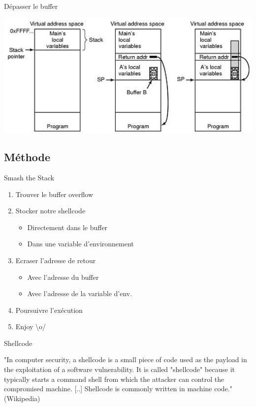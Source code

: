\documentclass{beamer}
\begin{document}
\begin{frame}{Dépasser le buffer}
	\begin{center}
		\includegraphics[width=1\textwidth]{images/buffer_overflow_attack.jpg}
	\end{center}
\end{frame}

\subsection{Méthode}

\begin{frame}{Smash the Stack}
	\begin{enumerate}
		\itemsep1.3em
		\item Trouver le buffer overflow
		\item Stocker notre shellcode
		\begin{itemize}
			\item Directement dans le buffer
			\item Dans une variable d'environnement
		\end{itemize}
		\item Ecraser l'adresse de retour
		\begin{itemize}
			\item Avec l'adresse du buffer
			\item Avec l'adresse de la variable d'env.
		\end{itemize}
		\item Poursuivre l'exécution
		\item Enjoy \Large{\textbackslash o/}
	\end{enumerate}
\end{frame}

\begin{frame}{Shellcode}
	\begin{center}
		"In computer security, a shellcode is a small piece of code used as the payload in the exploitation of a software vulnerability. It is called "shellcode" because it typically starts a command shell from which the attacker can control the compromised machine. [..] Shellcode is commonly written in machine code." (Wikipedia)
	\end{center}
\end{frame}
\end{document}
